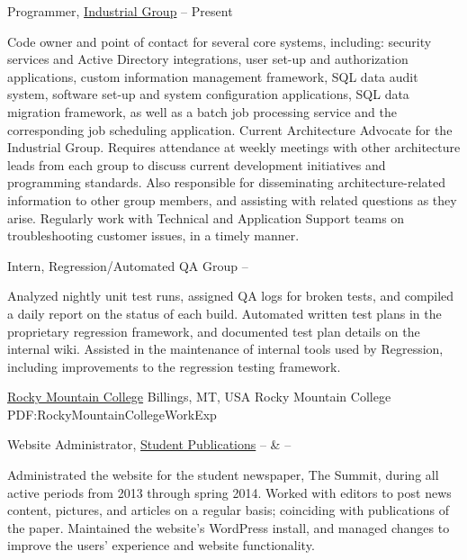 \documentclass[letterpaper,MMMyyyy,nonstopmode]{simpleresumecv}
\begin{document}
\begin{Body}
\Entry
Programmer,
\href{http://www.cu.net/industrial}
{Industrial Group}
\hfill
{} --
Present
\begin{Detail}
\BulletItem
Code owner and point of contact for several core systems, including: security services and Active Directory integrations, user set-up and authorization applications, custom information management framework, SQL data audit system, software set-up and system configuration applications, SQL data migration framework, as well as a batch job processing service and the corresponding job scheduling application.
\BulletItem
Current Architecture Advocate for the Industrial Group. Requires attendance at weekly meetings with other architecture leads from each group to discuss current development initiatives and programming standards. Also responsible for disseminating architecture-related information to other group members, and assisting with related questions as they arise.
\BulletItem
Regularly work with Technical and Application Support teams on troubleshooting customer issues, in a timely manner.
\end{Detail}

\Gap

\Entry
Intern,
Regression/Automated QA Group
\hfill
{} --
\begin{Detail}
\BulletItem
Analyzed nightly unit test runs, assigned QA logs for broken tests, and compiled a daily report on the status of each build.
\BulletItem
Automated written test plans in the proprietary regression framework, and documented test plan details on the internal wiki.
\BulletItem
Assisted in the maintenance of internal tools used by Regression, including improvements to the regression testing framework.
\end{Detail}

\Gap

\SubSection
{\href{http://www.rocky.edu}
{Rocky Mountain College}
\hfill Billings, MT, USA}
{Rocky Mountain College}
{PDF:RockyMountainCollegeWorkExp}

\Gap

\Entry
Website Administrator,
\href{http://summit.rocky.edu}
{Student Publications}
\hfill
{} --
 \&
 --
\begin{Detail}
\BulletItem
Administrated the website for the student newspaper, The Summit, during all active periods from 2013 through spring 2014.
\BulletItem
Worked with editors to post news content, pictures, and articles on a regular basis; coinciding with publications of the paper.
\BulletItem
Maintained the website's WordPress install, and managed changes to improve the users' experience and website functionality.
\end{Detail}


\end{Body}
\end{document}
